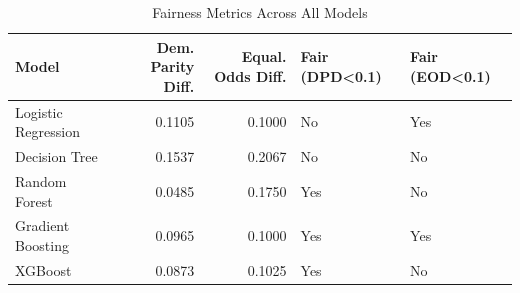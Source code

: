 \begin{table}
\caption{Fairness Metrics Across All Models}
\label{tab:fairness}
\begin{tabular}{lrrll}
\toprule
Model & Dem. Parity Diff. & Equal. Odds Diff. & Fair (DPD<0.1) & Fair (EOD<0.1) \\
\midrule
Logistic Regression & 0.1105 & 0.1000 & No & Yes \\
Decision Tree & 0.1537 & 0.2067 & No & No \\
Random Forest & 0.0485 & 0.1750 & Yes & No \\
Gradient Boosting & 0.0965 & 0.1000 & Yes & Yes \\
XGBoost & 0.0873 & 0.1025 & Yes & No \\
\bottomrule
\end{tabular}
\end{table}
